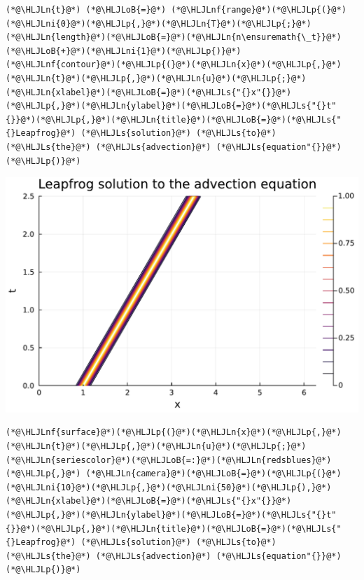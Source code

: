 \documentclass[12pt,landscape]{article}
\newcommand{\HLJLn}[1]{#1}
\newcommand{\HLJLnf}[1]{\textcolor[RGB]{66,102,213}{#1}}
\newcommand{\HLJLs}[1]{\textcolor[RGB]{201,61,57}{#1}}
\newcommand{\HLJLni}[1]{\textcolor[RGB]{59,151,46}{#1}}
\newcommand{\HLJLoB}[1]{\textcolor[RGB]{102,102,102}{\textbf{#1}}}
\newcommand{\HLJLp}[1]{#1}
\begin{document}
{\begin{lstlisting}
(*@\HLJLn{t}@*) (*@\HLJLoB{=}@*) (*@\HLJLnf{range}@*)(*@\HLJLp{(}@*)(*@\HLJLni{0}@*)(*@\HLJLp{,}@*)(*@\HLJLn{T}@*)(*@\HLJLp{;}@*)(*@\HLJLn{length}@*)(*@\HLJLoB{=}@*)(*@\HLJLn{n\ensuremath{\_t}}@*)(*@\HLJLoB{+}@*)(*@\HLJLni{1}@*)(*@\HLJLp{)}@*)
(*@\HLJLnf{contour}@*)(*@\HLJLp{(}@*)(*@\HLJLn{x}@*)(*@\HLJLp{,}@*)(*@\HLJLn{t}@*)(*@\HLJLp{,}@*)(*@\HLJLn{u}@*)(*@\HLJLp{;}@*)(*@\HLJLn{xlabel}@*)(*@\HLJLoB{=}@*)(*@\HLJLs{"{}x"{}}@*)(*@\HLJLp{,}@*)(*@\HLJLn{ylabel}@*)(*@\HLJLoB{=}@*)(*@\HLJLs{"{}t"{}}@*)(*@\HLJLp{,}@*)(*@\HLJLn{title}@*)(*@\HLJLoB{=}@*)(*@\HLJLs{"{}Leapfrog}@*) (*@\HLJLs{solution}@*) (*@\HLJLs{to}@*) (*@\HLJLs{the}@*) (*@\HLJLs{advection}@*) (*@\HLJLs{equation"{}}@*)(*@\HLJLp{)}@*)
\end{lstlisting}

\includegraphics[width=\linewidth]{jl_qsW2Qg/Fourier_17_1.pdf}

\begin{lstlisting}
(*@\HLJLnf{surface}@*)(*@\HLJLp{(}@*)(*@\HLJLn{x}@*)(*@\HLJLp{,}@*)(*@\HLJLn{t}@*)(*@\HLJLp{,}@*)(*@\HLJLn{u}@*)(*@\HLJLp{;}@*)(*@\HLJLn{seriescolor}@*)(*@\HLJLoB{=:}@*)(*@\HLJLn{redsblues}@*)(*@\HLJLp{,}@*) (*@\HLJLn{camera}@*)(*@\HLJLoB{=}@*)(*@\HLJLp{(}@*)(*@\HLJLni{10}@*)(*@\HLJLp{,}@*)(*@\HLJLni{50}@*)(*@\HLJLp{),}@*)
(*@\HLJLn{xlabel}@*)(*@\HLJLoB{=}@*)(*@\HLJLs{"{}x"{}}@*)(*@\HLJLp{,}@*)(*@\HLJLn{ylabel}@*)(*@\HLJLoB{=}@*)(*@\HLJLs{"{}t"{}}@*)(*@\HLJLp{,}@*)(*@\HLJLn{title}@*)(*@\HLJLoB{=}@*)(*@\HLJLs{"{}Leapfrog}@*) (*@\HLJLs{solution}@*) (*@\HLJLs{to}@*) (*@\HLJLs{the}@*) (*@\HLJLs{advection}@*) (*@\HLJLs{equation"{}}@*)(*@\HLJLp{)}@*)
\end{lstlisting}

}
\end{document}
